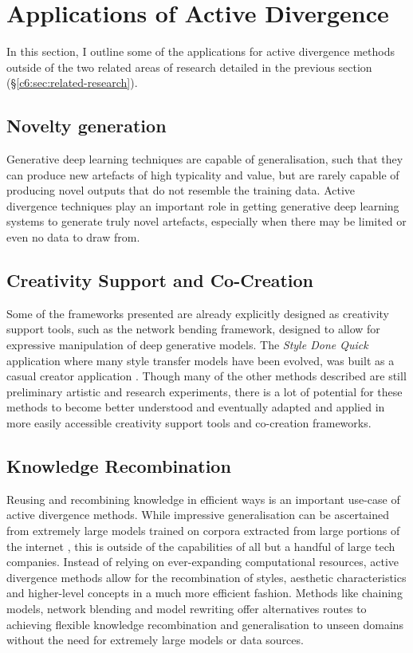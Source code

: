 \section{Applications of Active Divergence}

In this section, I outline some of the applications for active divergence methods outside of the two related areas of research detailed in the previous section (\S \ref{c6:sec:related-research}).

\subsection{Novelty generation}

Generative deep learning techniques are capable of generalisation, such that they can produce new artefacts of high typicality and value, but are rarely capable of producing novel outputs that do not resemble the training data. 
Active divergence techniques play an important role in getting generative deep learning systems to generate truly novel artefacts, especially when there may be limited or even no data to draw from. 

\subsection{Creativity Support and Co-Creation}

Some of the frameworks presented are already explicitly designed as creativity support tools, such as the network bending framework, designed to allow for expressive manipulation of deep generative models. 
The \textit{Style Done Quick} \citep{colton2021evolving} application where many style transfer models have been evolved, was built as a casual creator application \citep{compton2015casual}. 
Though many of the other methods described are still preliminary artistic and research experiments, there is a lot of potential for these methods to become better understood and eventually adapted and applied in more easily accessible creativity support tools and co-creation frameworks. 

\subsection{Knowledge Recombination}

Reusing and recombining knowledge in efficient ways is an important use-case of active divergence methods. While impressive generalisation can be ascertained from extremely large models trained on corpora extracted from large portions of the internet \citep{ramesh2021zero}, this is outside of the capabilities of all but a handful of large tech companies. 
Instead of relying on ever-expanding computational resources, active divergence methods allow for the recombination of styles, aesthetic characteristics and higher-level concepts in a much more efficient fashion. 
Methods like chaining models, network blending and model rewriting offer alternatives routes to achieving flexible knowledge recombination and generalisation to unseen domains without the need for extremely large models or data sources. 

